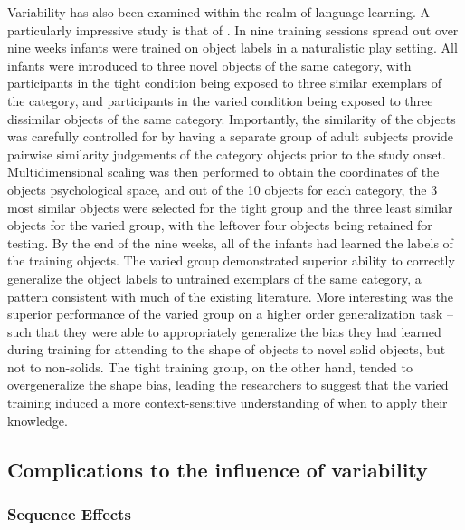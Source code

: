 \documentclass[
  12pt,
  letterpaper,
]{article}
\begin{document}
Variability has also been examined within the realm of language
learning. A particularly impressive study is that of
\autocite{perryLearnLocallyThink2010}. In nine training sessions spread
out over nine weeks infants were trained on object labels in a
naturalistic play setting. All infants were introduced to three novel
objects of the same category, with participants in the tight condition
being exposed to three similar exemplars of the category, and
participants in the varied condition being exposed to three dissimilar
objects of the same category. Importantly, the similarity of the objects
was carefully controlled for by having a separate group of adult
subjects provide pairwise similarity judgements of the category objects
prior to the study onset. Multidimensional scaling was then performed to
obtain the coordinates of the objects psychological space, and out of
the 10 objects for each category, the 3 most similar objects were
selected for the tight group and the three least similar objects for the
varied group, with the leftover four objects being retained for testing.
By the end of the nine weeks, all of the infants had learned the labels
of the training objects. The varied group demonstrated superior ability
to correctly generalize the object labels to untrained exemplars of the
same category, a pattern consistent with much of the existing
literature. More interesting was the superior performance of the varied
group on a higher order generalization task -- such that they were able
to appropriately generalize the bias they had learned during training
for attending to the shape of objects to novel solid objects, but not to
non-solids. The tight training group, on the other hand, tended to
overgeneralize the shape bias, leading the researchers to suggest that
the varied training induced a more context-sensitive understanding of
when to apply their knowledge.

\subsection{Complications to the influence of
variability}\label{complications-to-the-influence-of-variability}

\subsubsection{Sequence Effects}\label{sequence-effects}
\end{document}

